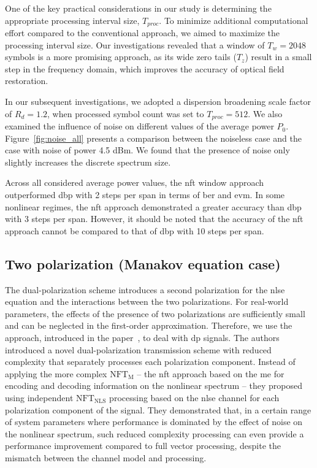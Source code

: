 One of the key practical considerations in our study is determining the appropriate processing interval size, $T_{proc}$. To minimize additional computational effort compared to the conventional approach, we aimed to maximize the processing interval size. Our investigations revealed that a window of $T_w=2048$ symbols is a more promising approach, as its wide zero tails ($T_z$) result in a small step in the frequency domain, which improves the accuracy of optical field restoration.

In our subsequent investigations, we adopted a dispersion broadening scale factor of $R_d=1.2$, when processed symbol count was set to $T_{proc} = 512$. We also examined the influence of noise on different values of the average power $P_0$. Figure~\ref{fig:noise_all} presents a comparison between the noiseless case and the case with noise of power 4.5 dBm. We found that the presence of noise only slightly increases the discrete spectrum size.

Across all considered average power values, the \acrshort{nft} window approach outperformed \acrshort{dbp} with 2 steps per span in terms of \acrfull{ber} and \acrfull{evm}. In some nonlinear regimes, the \acrshort{nft} approach demonstrated a greater accuracy than \acrshort{dbp} with 3 steps per span. However, it should be noted that the accuracy of the \acrshort{nft} approach cannot be compared to that of \acrshort{dbp} with 10 steps per span.


\subsection{Two polarization (Manakov equation case)}

The dual-polarization scheme introduces a second polarization for the \acrshort{nlse} equation and the interactions between the two polarizations. For real-world parameters, the effects of the presence of two polarizations are sufficiently small and can be neglected in the first-order approximation. Therefore, we use the approach, introduced in the paper~\cite{Civelli2019}, to deal with \acrshort{dp} signals.
The authors introduced a novel dual-polarization transmission scheme with reduced complexity that separately processes each polarization component. Instead of applying the more complex $\text{NFT}_\text{M}$ -- the \acrshort{nft} approach based on the \acrlong{me} for encoding and decoding information on the nonlinear spectrum -- they proposed using independent $\text{NFT}_\text{NLS}$ processing based on the \acrshort{nlse} channel for each polarization component of the signal. They demonstrated that, in a certain range of system parameters where performance is dominated by the effect of noise on the nonlinear spectrum, such reduced complexity processing can even provide a performance improvement compared to full vector processing, despite the mismatch between the channel model and processing.

